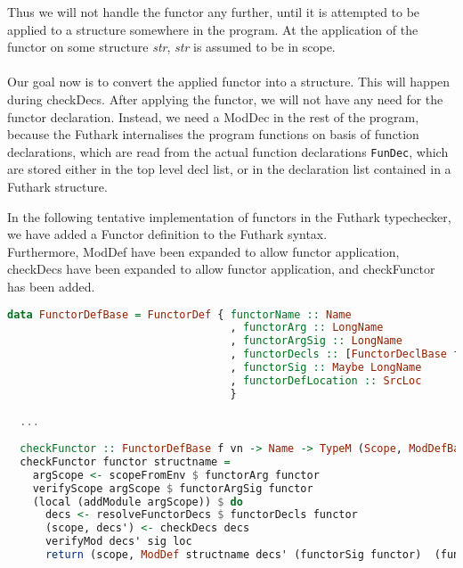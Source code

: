 Thus we will not handle the functor any further, until it is attempted to be
applied to a structure somewhere in the program. At the application of the
functor on some structure \textit{str}, \textit{str} is assumed to be in scope.
\\\\
Our goal now is to convert the applied functor into a structure. This will
happen during checkDecs.
After applying the functor, we will not have any need
for the functor declaration.
Instead, we need a ModDec in the rest of the program, because the Futhark
internalises the program functions on basis of function declarations, which are
read from the actual function declarations \texttt{FunDec}, which are stored
either in the top level decl list, or in the declaration list contained in a
Futhark structure.

In the following tentative implementation of functors in the Futhark
typechecker, we have added a Functor definition to the Futhark syntax.\\
Furthermore, ModDef have been expanded to allow functor application, checkDecs
have been expanded to allow functor application, and checkFunctor has been added.

\begin{lstlisting}[language=Haskell]
  data FunctorDefBase = FunctorDef { functorName :: Name
                                   , functorArg :: LongName
                                   , functorArgSig :: LongName
                                   , functorDecls :: [FunctorDeclBase f vn]
                                   , functorSig :: Maybe LongName
                                   , functorDefLocation :: SrcLoc
                                   }

  ...
                                   
  checkFunctor :: FunctorDefBase f vn -> Name -> TypeM (Scope, ModDefBase Info VName)
  checkFunctor functor structname =
    argScope <- scopeFromEnv $ functorArg functor    
    verifyScope argScope $ functorArgSig functor
    (local (addModule argScope)) $ do
      decs <- resolveFunctorDecs $ functorDecls functor
      (scope, decs') <- checkDecs decs
      verifyMod decs' sig loc
      return (scope, ModDef structname decs' (functorSig functor)  (functorDefLocation functor))
\end{lstlisting}
